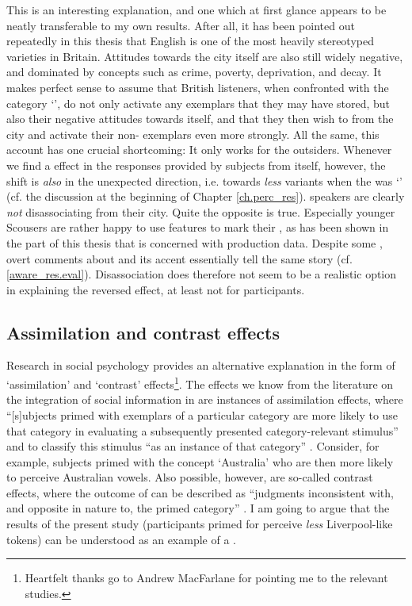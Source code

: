 This is an interesting explanation, and one which at first glance appears to be neatly transferable to my own results.
After all, it has been pointed out repeatedly in this thesis that  English is one of the most heavily stereotyped varieties in Britain.
Attitudes towards the city itself are also still widely negative, and dominated by concepts such as crime, poverty, deprivation, and decay.
It makes perfect sense to assume that British listeners, when confronted with the category `', do not only activate any  exemplars that they may have stored, but also their negative attitudes towards  itself, and that they then wish to  from the city and activate their non- exemplars even more strongly.
All the same, this account has one crucial shortcoming: It only works for the outsiders.
Whenever we find a  effect in the responses provided by subjects from  itself, however, the shift is \emph{also} in the unexpected direction, i.e. towards \emph{less}  variants when the  was `' (cf. the discussion at the beginning of Chapter \ref{ch.perc_res}).
 speakers are clearly \emph{not} disassociating from their city.
Quite the opposite is true.
Especially younger Scousers are rather happy to use  features to mark their , as has been shown in the part of this thesis that is concerned with production data.
Despite some , overt comments about  and its accent essentially tell the same story (cf. \ref{aware_res.eval}).
Disassociation does therefore not seem to be a realistic option in explaining the reversed  effect, at least not for  participants.

		\subsection{Assimilation and contrast effects}

Research in social psychology provides an alternative explanation in the form of `assimilation' and `contrast' effects\footnote{Heartfelt thanks go to Andrew MacFarlane for pointing me to the relevant studies.}.
The  effects we know from the literature on the integration of social information in  are instances of assimilation effects, where ``[s]ubjects primed with exemplars of a particular category are more likely to use that category in evaluating a subsequently presented category-relevant stimulus'' and to classify this stimulus ``as an instance of that category'' \parencite[1106--1107]{herr1986}.
Consider, for example, subjects primed with the concept `Australia' who are then more likely to perceive Australian vowels.
Also possible, however, are so-called contrast effects, where the outcome of  can be described as ``judgments inconsistent with, and opposite in nature to, the primed category'' \parencite[1107]{herr1986}.
I am going to argue that the results of the present study (participants primed for  perceive \emph{less} Liverpool-like tokens) can be understood as an example of a .

